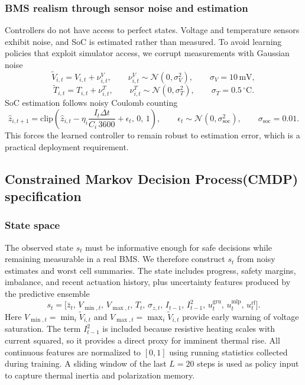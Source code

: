 \documentclass[%
 aip,
 amsmath,amssymb,
reprint, onecolumn %
]{revtex4-1}
\begin{document}
\subsubsection{BMS realism through sensor noise and estimation}
Controllers do not have access to perfect states. Voltage and temperature sensors exhibit noise, and SoC is estimated rather than measured. To avoid learning policies that exploit simulator access, we corrupt measurements with Gaussian noise
\begin{equation}
\tilde V_{i,t} = V_{i,t} + \nu^V_{i,t},
\qquad
\nu^V_{i,t} \sim \mathcal{N}(0,\sigma_V^2),
\qquad
\sigma_V = 10\,\mathrm{mV},
\end{equation}
\begin{equation}
\tilde T_{i,t} = T_{i,t} + \nu^T_{i,t},
\qquad
\nu^T_{i,t} \sim \mathcal{N}(0,\sigma_T^2),
\qquad
\sigma_T = 0.5\,^{\circ}\mathrm{C}.
\end{equation}
SoC estimation follows noisy Coulomb counting
\begin{equation}
\hat{z}_{i,t+1} = \mathrm{clip}\!\left(\hat{z}_{i,t} - \eta_i\frac{I_t \Delta t}{C_i\,3600} + \epsilon_t,\,0,\,1\right),
\qquad
\epsilon_t \sim \mathcal{N}(0,\sigma_{\mathrm{soc}}^2),
\qquad
\sigma_{\mathrm{soc}} = 0.01.
\end{equation}
This forces the learned controller to remain robust to estimation error, which is a practical deployment requirement.

\subsection{Constrained Markov Decision Process(CMDP) specification}

\subsubsection{State space}
The observed state $s_t$ must be informative enough for safe decisions while remaining measurable in a real BMS. We therefore construct $s_t$ from noisy estimates and worst cell summaries. The state includes progress, safety margins, imbalance, and recent actuation history, plus uncertainty features produced by the predictive ensemble
\begin{equation}
s_t =
\Big[
\bar z_t,\,
V_{\min,t},\,
V_{\max,t},\,
T_t,\,
\sigma_{z,t},\,
I_{t-1},\,
I_{t-1}^2,\,
u^{\mathrm{gru}}_t,\,
u^{\mathrm{mlp}}_t,\,
u^{\mathrm{rf}}_t
\Big].
\end{equation}
Here $V_{\min,t}=\min_i \tilde V_{i,t}$ and $V_{\max,t}=\max_i \tilde V_{i,t}$ provide early warning of voltage saturation. The term $I_{t-1}^2$ is included because resistive heating scales with current squared, so it provides a direct proxy for imminent thermal rise. All continuous features are normalized to $[0,1]$ using running statistics collected during training. A sliding window of the last $L=20$ steps is used as policy input to capture thermal inertia and polarization memory.
\end{document}
